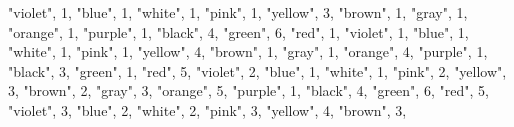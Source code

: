 \documentclass[
]{article}
\newenvironment{Shaded}{\begin{snugshade}}{\end{snugshade}}
\newcommand{\DecValTok}[1]{\textcolor[rgb]{0.00,0.00,0.81}{#1}}
\newcommand{\NormalTok}[1]{#1}
\newcommand{\StringTok}[1]{\textcolor[rgb]{0.31,0.60,0.02}{#1}}
\begin{document}
\begin{Shaded}
\begin{Highlighting}[]
  \StringTok{"violet"}\NormalTok{, }\DecValTok{1}\NormalTok{,}
  \StringTok{"blue"}\NormalTok{, }\DecValTok{1}\NormalTok{,}
  \StringTok{"white"}\NormalTok{, }\DecValTok{1}\NormalTok{,}
  \StringTok{"pink"}\NormalTok{, }\DecValTok{1}\NormalTok{,}
  \StringTok{"yellow"}\NormalTok{, }\DecValTok{3}\NormalTok{,}
  \StringTok{"brown"}\NormalTok{, }\DecValTok{1}\NormalTok{,}
  \StringTok{"gray"}\NormalTok{, }\DecValTok{1}\NormalTok{,}
  \StringTok{"orange"}\NormalTok{, }\DecValTok{1}\NormalTok{,}
  \StringTok{"purple"}\NormalTok{, }\DecValTok{1}\NormalTok{,}
    \StringTok{"black"}\NormalTok{, }\DecValTok{4}\NormalTok{,}
  \StringTok{"green"}\NormalTok{, }\DecValTok{6}\NormalTok{,}
  \StringTok{"red"}\NormalTok{, }\DecValTok{1}\NormalTok{,}
  \StringTok{"violet"}\NormalTok{, }\DecValTok{1}\NormalTok{,}
  \StringTok{"blue"}\NormalTok{, }\DecValTok{1}\NormalTok{,}
  \StringTok{"white"}\NormalTok{, }\DecValTok{1}\NormalTok{,}
  \StringTok{"pink"}\NormalTok{, }\DecValTok{1}\NormalTok{,}
  \StringTok{"yellow"}\NormalTok{, }\DecValTok{4}\NormalTok{,}
  \StringTok{"brown"}\NormalTok{, }\DecValTok{1}\NormalTok{,}
  \StringTok{"gray"}\NormalTok{, }\DecValTok{1}\NormalTok{,}
  \StringTok{"orange"}\NormalTok{, }\DecValTok{4}\NormalTok{,}
  \StringTok{"purple"}\NormalTok{, }\DecValTok{1}\NormalTok{,}
    \StringTok{"black"}\NormalTok{, }\DecValTok{3}\NormalTok{,}
  \StringTok{"green"}\NormalTok{, }\DecValTok{1}\NormalTok{,}
  \StringTok{"red"}\NormalTok{, }\DecValTok{5}\NormalTok{,}
  \StringTok{"violet"}\NormalTok{, }\DecValTok{2}\NormalTok{,}
  \StringTok{"blue"}\NormalTok{, }\DecValTok{1}\NormalTok{,}
  \StringTok{"white"}\NormalTok{, }\DecValTok{1}\NormalTok{,}
  \StringTok{"pink"}\NormalTok{, }\DecValTok{2}\NormalTok{,}
  \StringTok{"yellow"}\NormalTok{, }\DecValTok{3}\NormalTok{,}
  \StringTok{"brown"}\NormalTok{, }\DecValTok{2}\NormalTok{,}
  \StringTok{"gray"}\NormalTok{, }\DecValTok{3}\NormalTok{,}
  \StringTok{"orange"}\NormalTok{, }\DecValTok{5}\NormalTok{,}
  \StringTok{"purple"}\NormalTok{, }\DecValTok{1}\NormalTok{,}
    \StringTok{"black"}\NormalTok{, }\DecValTok{4}\NormalTok{,}
  \StringTok{"green"}\NormalTok{, }\DecValTok{6}\NormalTok{,}
  \StringTok{"red"}\NormalTok{, }\DecValTok{5}\NormalTok{,}
  \StringTok{"violet"}\NormalTok{, }\DecValTok{3}\NormalTok{,}
  \StringTok{"blue"}\NormalTok{, }\DecValTok{2}\NormalTok{,}
  \StringTok{"white"}\NormalTok{, }\DecValTok{2}\NormalTok{,}
  \StringTok{"pink"}\NormalTok{, }\DecValTok{3}\NormalTok{,}
  \StringTok{"yellow"}\NormalTok{, }\DecValTok{4}\NormalTok{,}
  \StringTok{"brown"}\NormalTok{, }\DecValTok{3}\NormalTok{,}

\end{Highlighting}
\end{Shaded}
\end{document}
